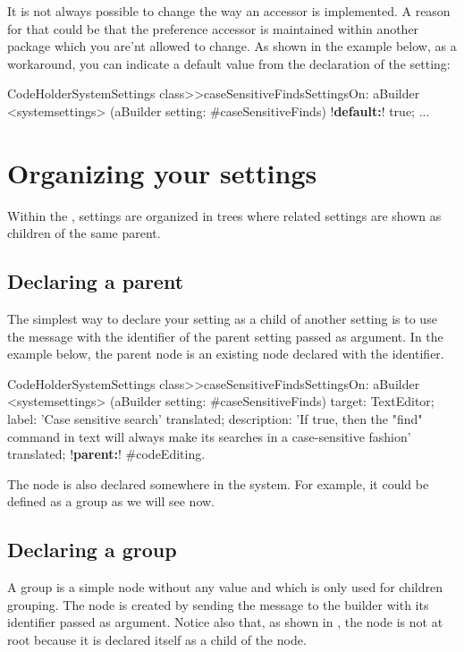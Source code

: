 \documentclass[a4paper,10pt,twoside]{book}
\begin{document}
It is not always possible to change the way an accessor is implemented. A reason for that could be that the preference accessor is maintained within another package which you are'nt allowed to change. As shown in the example below, as a workaround, you can indicate a default value from the declaration of the setting:
\begin{code}{}
CodeHolderSystemSettings class>>caseSensitiveFindsSettingsOn: aBuilder
	<systemsettings>
	(aBuilder setting: #caseSensitiveFinds)
		!\textbf{default:}! true;
    ...
\end{code}

\section{Organizing your settings}

Within the \setbrowser, settings are organized in trees where related settings are shown as children of the same parent. 

\subsection{Declaring a parent}
The simplest way to declare your setting as a child of another setting is to use the  message with the identifier of the parent setting passed as argument. In the example below, the parent node is an existing node declared with the  identifier. 

\begin{code}{}
CodeHolderSystemSettings class>>caseSensitiveFindsSettingsOn: aBuilder
	<systemsettings>
	(aBuilder setting: #caseSensitiveFinds) 
		target: TextEditor;
		label: 'Case sensitive search' translated;
		description: 'If true, then the "find" command in text will always make its searches in a case-sensitive fashion' translated;
		!\textbf{parent:}! #codeEditing.
\end{code}
The  node is also declared somewhere in the system. For example, it could be defined as a group as we will see now. 


\subsection{Declaring a group}

A group is a simple node without any value and which is only used for children grouping.
The  node is created by sending the  message to the builder with its identifier passed as argument.  Notice also that, as shown in , the  node is not at root because it is declared itself as a child of the  node.
\end{document}
